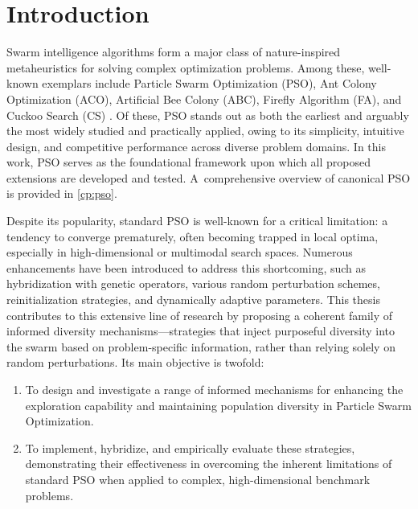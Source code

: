 \chapter{Introduction}
\label{cp:introduction}

{



Swarm intelligence algorithms form a major class of nature-inspired metaheuristics for solving complex optimization problems. Among these, well-known exemplars include Particle Swarm Optimization (PSO), Ant Colony Optimization (ACO), Artificial Bee Colony (ABC), Firefly Algorithm (FA), and Cuckoo Search (CS) \citep[see,][]{kennedy1995particle,dorigo1999aco,karaboga2005abc,yang2009firefly,yang2009cuckoo}. Of these, PSO stands out as both the earliest and arguably the most widely studied and practically applied, owing to its simplicity, intuitive design, and competitive performance across diverse problem domains. In this work, PSO serves as the foundational framework upon which all proposed extensions are developed and tested. A~comprehensive overview of canonical PSO is provided in \autoref{cp:pso}.

Despite its popularity, standard PSO is well-known for a critical limitation: a tendency to converge prematurely, often becoming trapped in local optima, especially in high-dimensional or multimodal search spaces. Numerous enhancements have been introduced to address this shortcoming, such as hybridization with genetic operators, various random perturbation schemes, reinitialization strategies, and dynamically adaptive parameters. This thesis contributes to this extensive line of research by proposing a coherent family of informed diversity mechanisms---strategies that inject purposeful diversity into the swarm based on problem-specific information, rather than relying solely on random perturbations.
Its main objective is twofold:
\begin{enumerate}
\item To design and investigate a range of informed mechanisms for enhancing the exploration capability and maintaining population diversity in Particle Swarm Optimization.
\item To implement, hybridize, and empirically evaluate these strategies, demonstrating their effectiveness in overcoming the inherent limitations of standard PSO when applied to complex, high-dimensional benchmark problems.
\end{enumerate}



}
